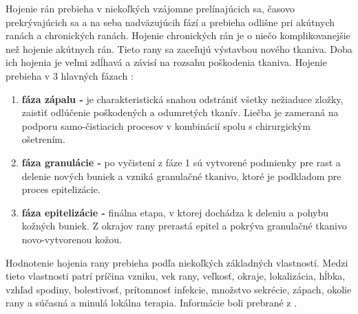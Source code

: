 Hojenie rán prebieha v niekoľkých vzájomne prelínajúcich sa, časovo prekrývajúcich sa a na seba nadväzujúcih fází a prebieha odlišne pri akútnych ranách a chronických ranách. Hojenie chronických rán je o niečo komplikovanejšie než hojenie akútnych rán. Tieto rany sa zaceľujú výstavbou nového tkaniva. Doba ich hojenia je veľmi zdĺhavá a závisí na rozsahu poškodenia tkaniva. Hojenie prebieha v 3 hlavných fázach \cite{Pokorna2012}:
\begin{enumerate}
\item \textbf{fáza zápalu -} je charakteristická snahou odstrániť všetky nežiaduce zložky, zaistiť odlúčenie poškodených a odumretých tkanív. Liečba je zameraná na podporu samo-čistiacich procesov v kombinácií spolu s chirurgickým ošetrením.
\item \textbf{fáza granulácie -} po vyčistení z fáze 1 sú vytvorené podmienky pre rast a delenie nových buniek a vzniká granulačné tkanivo, ktoré je podkladom pre proces epitelizácie.
\item \textbf{fáza epitelizácie -} finálna etapa, v ktorej dochádza k deleniu a pohybu kožných buniek. Z okrajov rany prerastá epitel a pokrýva granulačné tkanivo novo-vytvorenou kožou.
\end{enumerate}

Hodnotenie hojenia rany prebieha podľa niekoľkých základných vlastností. Medzi tieto vlastnosti patrí príčina vzniku, vek rany, veľkosť, okraje, lokalizácia, hĺbka, vzhľad spodiny, bolestivosť, prítomnosť infekcie, množstvo sekrécie, zápach, okolie rany a súčasná a minulá lokálna terapia. Informácie boli prebrané z \cite{pcCdSrbbhhlr5YcQ}.